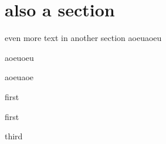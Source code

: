 \section{also a section}
even more text in another section
aoeuaoeu

aoeuoeu \cite{Hansen_2015}

aoeuaoe \cite{Hansen_2011}

first

first

third
